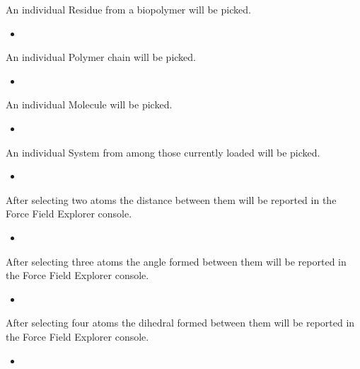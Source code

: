 \documentclass[letterpaper,11pt,english]{sphinxmanual}
\begin{document}
\sphinxAtStartPar
An individual Residue from a biopolymer will be picked.
\begin{itemize}
\item {} 
\sphinxAtStartPar
{}

\end{itemize}

\sphinxAtStartPar
An individual Polymer chain will be picked.
\begin{itemize}
\item {} 
\sphinxAtStartPar
{}

\end{itemize}

\sphinxAtStartPar
An individual Molecule will be picked.
\begin{itemize}
\item {} 
\sphinxAtStartPar
{}

\end{itemize}

\sphinxAtStartPar
An individual System from among those currently loaded will be picked.
\begin{itemize}
\item {} 
\sphinxAtStartPar
{}

\end{itemize}

\sphinxAtStartPar
After selecting two atoms the distance between them will be reported in the Force Field Explorer console.
\begin{itemize}
\item {} 
\sphinxAtStartPar
{}

\end{itemize}

\sphinxAtStartPar
After selecting three atoms the angle formed between them will be reported in the Force Field Explorer console.
\begin{itemize}
\item {} 
\sphinxAtStartPar
{}

\end{itemize}

\sphinxAtStartPar
After selecting four atoms the dihedral formed between them will be reported in the Force Field Explorer console.
\begin{itemize}
\item {} 
\sphinxAtStartPar
{}

\end{itemize}
\end{document}
